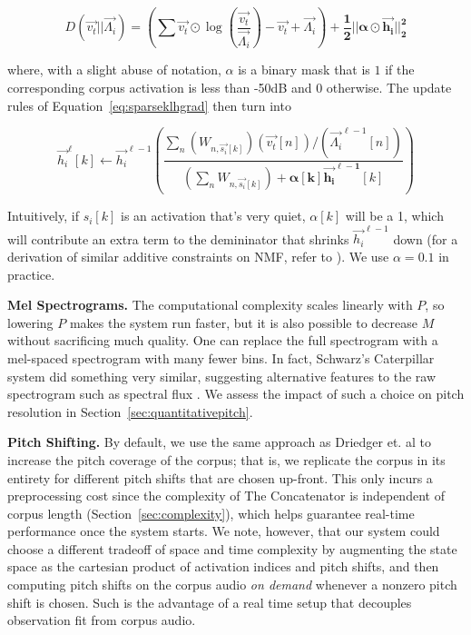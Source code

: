 \documentclass{article}
\begin{document}
\begin{equation}
    \label{eq:kllossalpha}
    D(\vec{v_t} || \vec{\Lambda_i}) = \left( \sum \vec{v_t} \odot \log \left( \frac{\vec{v_t}}{\vec{\Lambda_i}} \right) - \vec{v_t} + \vec{\Lambda_i} \right) + \boldsymbol{ \frac{1}{2} ||\alpha \odot \vec{h_i}||_2^2 }
    \end{equation}

where, with a slight abuse of notation, $\alpha$ is a binary mask that is $1$ if the corresponding corpus activation is less than -50dB and $0$ otherwise.  The update rules of Equation~\ref{eq:sparseklhgrad} then turn into 

\begin{equation}
    \label{eq:sparseklhgradalpha}
    \vec{h_i}^{\ell}[k]  \gets \vec{h_i}^{\ell-1} \left(  \frac{\sum_n (W_{n, \vec{s_i}[k]}) (\vec{v_t}[n]) / (\vec{\Lambda_i}^{\ell-1}[n]) }{ (\sum_{n} W_{n, \vec{s_i}[k]}) + \boldsymbol{ \alpha[k] \vec{h_i}^{\ell-1}}[k]} \right)
\end{equation}

Intuitively, if $s_i[k]$ is an activation that's very quiet, $\alpha[k]$ will be a 1, which will contribute an extra term to the demininator that shrinks $\vec{h_i}^{\ell-1}$ down (for a derivation of similar additive constraints on NMF, refer to \cite{virtanen2007monaural}).  We use $\alpha=0.1$ in practice.


\textbf{Mel Spectrograms.} The computational complexity scales linearly with $P$, so lowering $P$ makes the system run faster, but it is also possible to decrease $M$ without sacrificing much quality.  One can replace the full spectrogram with a mel-spaced spectrogram with many fewer bins.  In fact, Schwarz's Caterpillar system did something very similar, suggesting alternative features to the raw spectrogram such as spectral flux \cite{schwarz2000system}.  We assess the impact of such a choice on pitch resolution in Section~\ref{sec:quantitativepitch}.


\textbf{Pitch Shifting.} By default, we use the same approach as Driedger et. al to increase the pitch coverage of the corpus; that is, we replicate the corpus in its entirety for different pitch shifts that are chosen up-front.  This only incurs a preprocessing cost since the complexity of The Concatenator is independent of corpus length (Section~\ref{sec:complexity}), which helps guarantee real-time performance once the system starts.  We note, however, that our system could choose a different tradeoff of space and time complexity by augmenting the state space as the cartesian product of activation indices and pitch shifts, and then computing pitch shifts on the corpus audio {\em on demand} whenever a nonzero pitch shift is chosen.  Such is the advantage of a real time setup that decouples observation fit from corpus audio.
\end{document}
